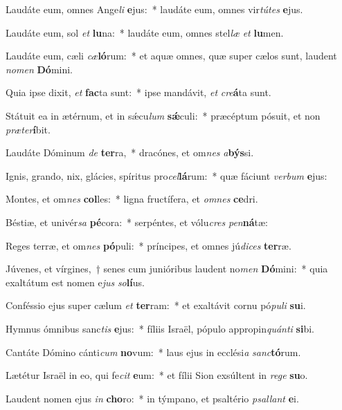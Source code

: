 \item Laudáte eum, omnes Ange\textit{li} \textbf{e}jus:~* laudáte eum, omnes vir\textit{tú}\textit{tes} \textbf{e}jus.
\item Laudáte eum, sol \textit{et} \textbf{lu}na:~* laudáte eum, omnes stel\textit{læ} \textit{et} \textbf{lu}men.
\item Laudáte eum, cæli \textit{cæ}\textbf{ló}rum:~* et aquæ omnes, quæ super cælos sunt, laudent \textit{no}\textit{men} \textbf{Dó}mini.
\item Quia ipse dixit, \textit{et} \textbf{fac}ta sunt:~* ipse mandávit, \textit{et} \textit{cre}\textbf{á}ta sunt.
\item Státuit ea in ætérnum, et in sǽcu\textit{lum} \textbf{sǽ}culi:~* præcéptum pósuit, et non \textit{præ}\textit{ter}\textbf{í}bit.
\item Laudáte Dóminum \textit{de} \textbf{ter}ra,~* dracónes, et om\textit{nes} \textit{a}\textbf{býs}si.
\item Ignis, grando, nix, glácies, spíritus pro\textit{cel}\textbf{lá}rum:~* quæ fáciunt \textit{ver}\textit{bum} \textbf{e}jus:
\item Montes, et om\textit{nes} \textbf{col}les:~* ligna fructífera, et \textit{om}\textit{nes} \textbf{ce}dri.
\item Béstiæ, et univér\textit{sa} \textbf{pé}cora:~* serpéntes, et vólu\textit{cres} \textit{pen}\textbf{ná}tæ:
\item Reges terræ, et om\textit{nes} \textbf{pó}puli:~* príncipes, et omnes jú\textit{di}\textit{ces} \textbf{ter}ræ.
\item Júvenes, et vírgines,~† senes cum junióribus laudent no\textit{men} \textbf{Dó}mini:~* quia exaltátum est nomen e\textit{jus} \textit{so}\textbf{lí}us.
\item Conféssio ejus super cælum \textit{et} \textbf{ter}ram:~* et exaltávit cornu pó\textit{pu}\textit{li} \textbf{su}i.
\item Hymnus ómnibus sanc\textit{tis} \textbf{e}jus:~* fíliis Israël, pópulo appropin\textit{quán}\textit{ti} \textbf{si}bi.
\item Cantáte Dómino cánti\textit{cum} \textbf{no}vum:~* laus ejus in ecclési\textit{a} \textit{sanc}\textbf{tó}rum.
\item Lætétur Israël in eo, qui fe\textit{cit} \textbf{e}um:~* et fílii Sion exsúltent in \textit{re}\textit{ge} \textbf{su}o.
\item Laudent nomen ejus \textit{in} \textbf{cho}ro:~* in týmpano, et psaltério \textit{psal}\textit{lant} \textbf{e}i.
